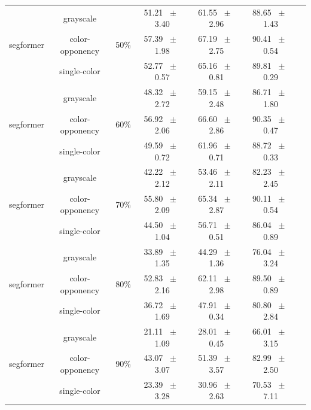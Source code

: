 \begin{table}[h]
\begin{tabular}{@{}lccc ccc@{}}
    \midrule
    \multirow{3}{*}{segformer} & grayscale & \multirow{3}{*}{50\%} & 51.21 ~$\pm$~ 3.40 & 61.55 ~$\pm$~ 2.96 & 88.65 ~$\pm$~ 1.43 \\
    & color-opponency &  & 57.39 ~$\pm$~ 1.98 & 67.19 ~$\pm$~ 2.75 & 90.41 ~$\pm$~ 0.54 \\
    & single-color &  & 52.77 ~$\pm$~ 0.57 & 65.16 ~$\pm$~ 0.81 & 89.81 ~$\pm$~ 0.29 \\
    \midrule
    \multirow{3}{*}{segformer} & grayscale & \multirow{3}{*}{60\%} & 48.32 ~$\pm$~ 2.72 & 59.15 ~$\pm$~ 2.48 & 86.71 ~$\pm$~ 1.80 \\
    & color-opponency &  & 56.92 ~$\pm$~ 2.06 & 66.60 ~$\pm$~ 2.86 & 90.35 ~$\pm$~ 0.47 \\
    & single-color &  & 49.59 ~$\pm$~ 0.72 & 61.96 ~$\pm$~ 0.71 & 88.72 ~$\pm$~ 0.33 \\
    \midrule
    \multirow{3}{*}{segformer} & grayscale & \multirow{3}{*}{70\%} & 42.22 ~$\pm$~ 2.12 & 53.46 ~$\pm$~ 2.11 & 82.23 ~$\pm$~ 2.45 \\
    & color-opponency &  & 55.80 ~$\pm$~ 2.09 & 65.34 ~$\pm$~ 2.87 & 90.11 ~$\pm$~ 0.54 \\
    & single-color &  & 44.50 ~$\pm$~ 1.04 & 56.71 ~$\pm$~ 0.51 & 86.04 ~$\pm$~ 0.89 \\
    \midrule
    \multirow{3}{*}{segformer} & grayscale & \multirow{3}{*}{80\%} & 33.89 ~$\pm$~ 1.35 & 44.29 ~$\pm$~ 1.36 & 76.04 ~$\pm$~ 3.24 \\
    & color-opponency &  & 52.83 ~$\pm$~ 2.16 & 62.11 ~$\pm$~ 2.98 & 89.50 ~$\pm$~ 0.89 \\
    & single-color &  & 36.72 ~$\pm$~ 1.69 & 47.91 ~$\pm$~ 0.34 & 80.80 ~$\pm$~ 2.84 \\
    \midrule
    \multirow{3}{*}{segformer} & grayscale & \multirow{3}{*}{90\%} & 21.11 ~$\pm$~ 1.09 & 28.01 ~$\pm$~ 0.45 & 66.01 ~$\pm$~ 3.15 \\
    & color-opponency &  & 43.07 ~$\pm$~ 3.07 & 51.39 ~$\pm$~ 3.57 & 82.99 ~$\pm$~ 2.50 \\
    & single-color &  & 23.39 ~$\pm$~ 3.28 & 30.96 ~$\pm$~ 2.63 & 70.53 ~$\pm$~ 7.11 \\
    \midrule
    \bottomrule
  \end{tabular}
  \label{tab:sparse_results_segformer_acdc_fog}
\end{table}
